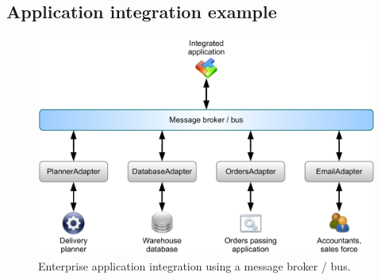 
\subsection{Application integration example}


\begin{figure}[htbp]
    \centering
    \includegraphics[width=\textwidth]{content/web-services/eai-scenario}
    \caption{Enterprise application integration using a message broker / bus.}
    \label{fig:eai-scenario}
\end{figure}

